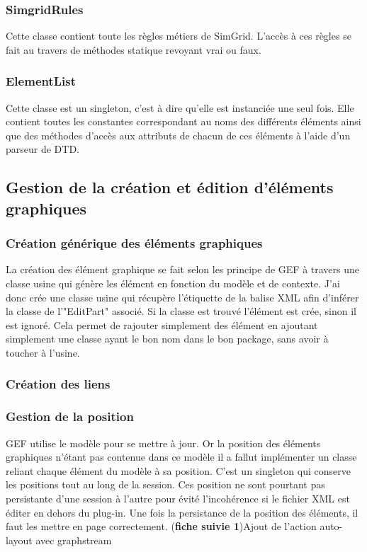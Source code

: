 \documentclass{article}
\begin{document}
        \subsubsection{SimgridRules}
        Cette classe contient toute les règles métiers de SimGrid. L'accès à ces règles se fait au travers de méthodes statique revoyant vrai ou faux.
        \subsubsection{ElementList}
        Cette classe est un singleton, c'est à dire qu'elle est instanciée une seul fois. Elle contient toutes les constantes correspondant au noms des différents éléments ainsi que des méthodes d'accès aux attributs de chacun de ces éléments à l'aide d'un parseur de DTD.
    \subsection{Gestion de la création et édition d'éléments graphiques}
        \subsubsection{Création générique des éléments graphiques}
        La création des élément graphique se fait selon les principe de GEF à travers une classe usine qui génère les élément en fonction du modèle et de contexte. J'ai donc crée une classe usine qui récupère l'étiquette de la balise XML afin d'inférer la classe de l'"EditPart" associé. Si la classe est trouvé l'élément est crée, sinon il est ignoré. Cela permet de rajouter simplement des élément en ajoutant simplement une classe ayant le bon nom dans le bon package, sans avoir à toucher à l'usine.
        \subsubsection{Création des liens}
        
        \subsubsection{Gestion de la position}
		GEF utilise le modèle pour se mettre à jour. Or la position des éléments graphiques n'étant pas contenue dans ce modèle il a fallut implémenter un classe reliant chaque élément du modèle à sa position. C'est un singleton qui conserve les positions tout au long de la session. Ces position ne sont pourtant pas persistante d'une session à l'autre pour évité l'incohérence si le fichier XML est éditer en dehors du plug-in.
	    Une fois la persistance de la position des éléments, il faut les mettre en page correctement. (\textbf{fiche suivie 1})Ajout de l'action auto-layout avec graphstream
\end{document}
